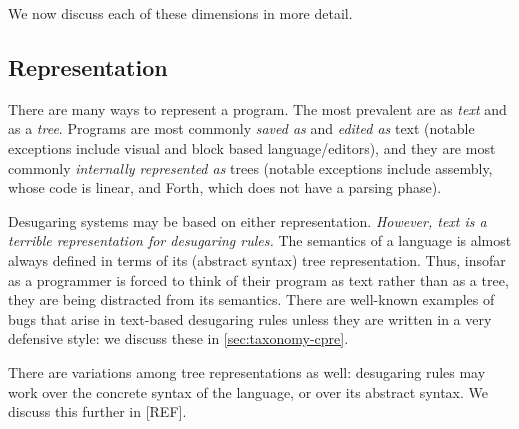 

We now discuss each of these dimensions in more detail.

\subsection{Representation}

There are many ways to represent a program. The most prevalent are as
\emph{text} and as a \emph{tree}. Programs are most commonly
\emph{saved as} and \emph{edited as} text (notable exceptions include
visual and block based language/editors), and they are most commonly
\emph{internally represented as} trees (notable exceptions include
assembly, whose code is linear, and Forth, which does not have a
parsing phase).

Desugaring systems may be based on either representation.
\emph{However, text is a terrible representation for desugaring rules.}
The semantics of a language is almost always defined in terms of its
(abstract syntax) tree representation. Thus, insofar as a programmer
is forced to think of their program as text rather
than as a tree, they are being distracted from its semantics. There
are well-known examples of bugs that arise in text-based desugaring
rules unless they are written in a very defensive style: we discuss
these in \ref{sec:taxonomy-cpre}.

There are variations among tree representations as well: desugaring
rules may work over the concrete syntax of the language, or over its
abstract syntax. We discuss this further in [REF].

